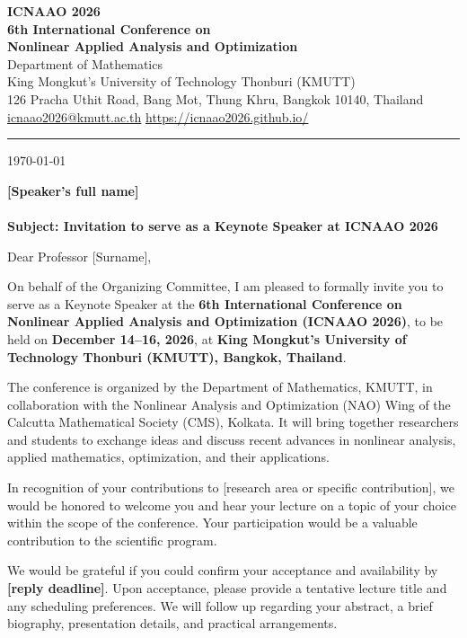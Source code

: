\documentclass[a4paper,11pt]{article}
\newcommand{\SpeakerName}{[Speaker's full name]}
\newcommand{\SpeakerSalutation}{Professor [Surname]}
\newcommand{\SpeakerAffiliation}{[University or institution]}
\newcommand{\SpeakerAddress}{[City, country]}
\newcommand{\SpeakerRole}{Keynote} %
\newcommand{\ResearchArea}{[research area or specific contribution]}
\newcommand{\ReplyDeadline}{[reply deadline]}
\newcommand{\LetterDate}{\today} %
\begin{document}
\begin{center}
  {\Large\bfseries ICNAAO 2026}\\[4pt]
  {\bfseries 6th International Conference on\\
  Nonlinear Applied Analysis and Optimization}\\[6pt]
  {\small Department of Mathematics\\
  King Mongkut's University of Technology Thonburi (KMUTT)\\
  126 Pracha Uthit Road, Bang Mot, Thung Khru, Bangkok 10140, Thailand\\
  \href{mailto:icnaao2026@kmutt.ac.th}{icnaao2026@kmutt.ac.th}
  \quad\textbar\quad \url{https://icnaao2026.github.io/}}
\end{center}
\hrule
\vspace{0.8em}

\hfill \LetterDate

\textbf{\SpeakerName}\\
\SpeakerAffiliation\\
\SpeakerAddress

\textbf{Subject: Invitation to serve as a \SpeakerRole{} Speaker at ICNAAO 2026}

Dear \SpeakerSalutation,

On behalf of the Organizing Committee, I am pleased to formally invite you
to serve as a \SpeakerRole{} Speaker at the \textbf{6th International Conference
on Nonlinear Applied Analysis and Optimization (ICNAAO 2026)}, to be held
on \textbf{December 14--16, 2026}, at \textbf{King Mongkut's University of
Technology Thonburi (KMUTT), Bangkok, Thailand}.

The conference is organized by the Department of Mathematics, KMUTT, in
collaboration with the Nonlinear Analysis and Optimization (NAO) Wing of
the Calcutta Mathematical Society (CMS), Kolkata. It will bring together
researchers and students to exchange ideas and discuss recent advances
in nonlinear analysis, applied mathematics, optimization, and their applications.

In recognition of your contributions to \ResearchArea, we would be honored
to welcome you and hear your lecture on a topic of your choice within the
scope of the conference. Your participation would be a valuable contribution
to the scientific program.

We would be grateful if you could confirm your acceptance and availability
by \textbf{\ReplyDeadline}. Upon acceptance, please provide a tentative lecture
title and any scheduling preferences. We will follow up regarding your
abstract, a brief biography, presentation details, and practical arrangements.
\end{document}
